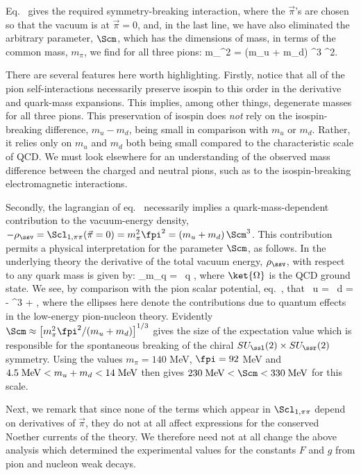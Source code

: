 \documentclass[12pt]{report}
\begin{document}
Eq.~ gives the required 
symmetry-breaking interaction, where
the $\vec\pi$'s are chosen so that the vacuum is
at $\vec \pi = 0$, and, in the last line, we have
also eliminated the arbitrary parameter, $\Scm$, which has
the dimensions of mass, in terms of the common mass,
$m_\pi$, we find for all three pions:
%
\eq
\label{pionmassprediction}
 m_\pi^2 =  (m_u + m_d) \; {\Scm^3 \over \fpi^2}.  
\eeq

There are several features here worth highlighting.
Firstly, notice that all of the pion self-interactions
necessarily preserve isospin to this order in the
derivative and quark-mass expansions. This implies, among
other things, degenerate masses for all three pions. This
preservation of isospin does {\em not} rely on the
isospin-breaking difference, $m_u - m_d$, being small in
comparison with $m_u$ or $m_d$. Rather, it relies only
on $m_u$ and $m_d$ both being small compared to the
characteristic scale of QCD. We must look elsewhere for
an understanding of the observed mass difference between
the charged and neutral pions, such as to the
isospin-breaking electromagnetic interactions.

Secondly, the lagrangian of eq.~
necessarily implies a quark-mass-dependent contribution to
the vacuum-energy density, $- \rho_\ssv
= \Scl_{1,\pi\pi}( \vec\pi =
0) = m_\pi^2 \fpi^2 = (m_u + m_d) \, \Scm^3$. This
contribution permits a physical interpretation for the
parameter $\Scm$, as follows. In the underlying theory the
derivative of the total vacuum energy, 
$\rho_\ssv$, with respect to any quark mass is given by:  
%
\eq
\label{qqbarvev}
{\partial \rho_\ssv \over \partial m_q} =
\bra{\Omega} \qbr \, q \ket{\Omega},
\eeq
%
where $\ket{\Omega}$ is the QCD ground state. We see, by
comparison with the pion scalar potential, 
eq.~, that  
%
\eq
\label{qqbarvevval}
\bra{\Omega} \ubr \, u \ket{\Omega} = 
\bra{\Omega} \dbr \, d  \ket{\Omega} =
- \Scm^3 + \cdots,
\eeq
%
where the ellipses here denote the contributions due to
quantum effects in the low-energy pion-nucleon theory.
Evidently $\Scm \approx \left[m_\pi^2 \fpi^2/(m_u+m_d)
\right]^{1/3}$ gives the size of the expectation value
which is responsible for the spontaneous breaking of the
chiral $SU_\ssl(2) \times SU_\ssr(2)$ symmetry. Using
the values $m_\pi = 140$ MeV, $\fpi = 92$ MeV and
$4.5 \; \hbox{MeV} < m_u + m_d < 14 \; \hbox{MeV}$
then gives $230 \; \hbox{MeV} < \Scm < 330 
\; \hbox{MeV}$ for this scale.

Next, we remark that since none of the terms which appear
in $\Scl_{1,\pi\pi}$ depend on derivatives of $\vec\pi$, they
do not at all affect expressions  for the
conserved Noether currents of the theory. We therefore need
not at all change the above analysis which determined the
experimental values for the constants $F$ and $g$ from pion
and nucleon weak decays.
\end{document}
